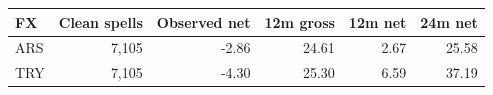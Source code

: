 \begin{tabular}{lrrrrr}
\toprule
FX & Clean spells & Observed net & 12m gross & 12m net & 24m net \\
\midrule
ARS & 7,105 & -2.86 & 24.61 & 2.67 & 25.58 \\
TRY & 7,105 & -4.30 & 25.30 & 6.59 & 37.19 \\
\bottomrule
\end{tabular}

